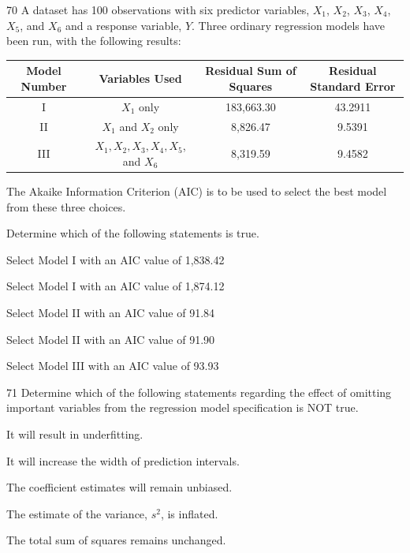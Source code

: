\begin{question}{70}
A dataset has 100 observations with six predictor variables, $X_1$, $X_2$, $X_3$, $X_4$, $X_5$, and $X_6$ and a response variable, $Y$. Three ordinary regression models have been run, with the following results:
\begin{center}
\begin{tabular}{|c|c|c|c|}
\hline
Model Number & Variables Used & Residual Sum of Squares & Residual Standard Error \\ \hline
I & $X_1$ only & 183{,}663.30 & 43.2911 \\ \hline
II & $X_1$ and $X_2$ only & 8{,}826.47 & 9.5391 \\ \hline
III & $X_1, X_2, X_3, X_4, X_5$, and $X_6$ & 8{,}319.59 & 9.4582 \\ \hline
\end{tabular}
\end{center}

The Akaike Information Criterion (AIC) is to be used to select the best model from these three choices.

Determine which of the following statements is true.

\begin{choices}
\item Select Model I with an AIC value of 1{,}838.42
\item Select Model I with an AIC value of 1{,}874.12
\item Select Model II with an AIC value of 91.84
\item Select Model II with an AIC value of 91.90
\item Select Model III with an AIC value of 93.93
\end{choices}
\end{question}

\begin{question}{71}
Determine which of the following statements regarding the effect of omitting important variables from the regression model specification is NOT true.

\begin{choices}
\item It will result in underfitting.
\item It will increase the width of prediction intervals.
\item The coefficient estimates will remain unbiased.
\item The estimate of the variance, $s^2$, is inflated.
\item The total sum of squares remains unchanged.
\end{choices}
\end{question}

